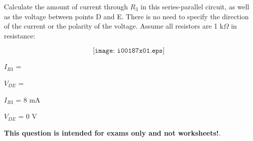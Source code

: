 

Calculate the amount of current through $R_3$ in this series-parallel circuit, as well as the voltage between points D and E.  There is no need to specify the direction of the current or the polarity of the voltage.  Assume all resistors are 1 k$\Omega$ in resistance:

$$\texttt{[image: i00187x01.eps]}$$

$I_{R3}$ = 

\vskip 10pt

$V_{DE}$ = 

\vskip 10pt







$I_{R3}$ = 8 mA

\vskip 10pt

$V_{DE}$ = 0 V







{\bf This question is intended for exams only and not worksheets!}.



